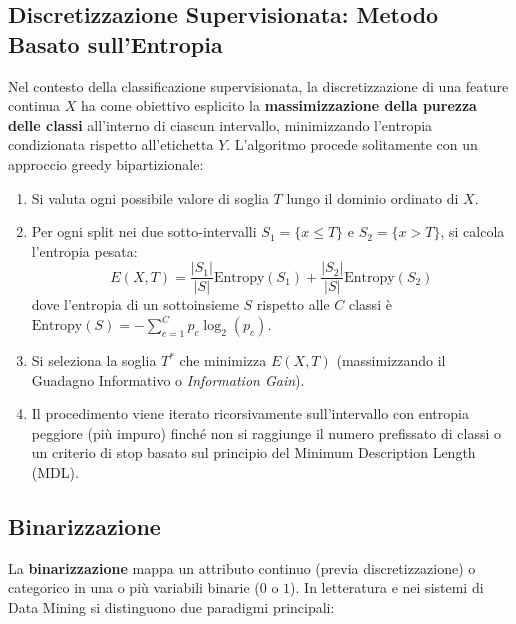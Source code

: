 \subsection{Discretizzazione Supervisionata: Metodo Basato sull'Entropia}
Nel contesto della classificazione supervisionata, la discretizzazione di una feature continua $X$ ha come obiettivo esplicito la \textbf{massimizzazione della purezza delle classi} all'interno di ciascun intervallo, minimizzando l'entropia condizionata rispetto all'etichetta $Y$.
L'algoritmo procede solitamente con un approccio greedy bipartizionale:
\begin{enumerate}
    \item Si valuta ogni possibile valore di soglia $T$ lungo il dominio ordinato di $X$.
    \item Per ogni split nei due sotto-intervalli $S_1 = \{x \le T\}$ e $S_2 = \{x > T\}$, si calcola l'entropia pesata:
    \begin{equation}
    E(X, T) = \frac{|S_1|}{|S|} \text{Entropy}(S_1) + \frac{|S_2|}{|S|} \text{Entropy}(S_2)
    \end{equation}
    dove l'entropia di un sottoinsieme $S$ rispetto alle $C$ classi è $\text{Entropy}(S) = -\sum_{c=1}^C p_c \log_2(p_c)$.
    \item Si seleziona la soglia $T^*$ che minimizza $E(X, T)$ (massimizzando il Guadagno Informativo o \textit{Information Gain}).
    \item Il procedimento viene iterato ricorsivamente sull'intervallo con entropia peggiore (più impuro) finché non si raggiunge il numero prefissato di classi o un criterio di stop basato sul principio del Minimum Description Length (MDL).
\end{enumerate}

\subsection{Binarizzazione}
La \textbf{binarizzazione} mappa un attributo continuo (previa discretizzazione) o categorico in una o più variabili binarie ($0$ o $1$). In letteratura e nei sistemi di Data Mining si distinguono due paradigmi principali:

